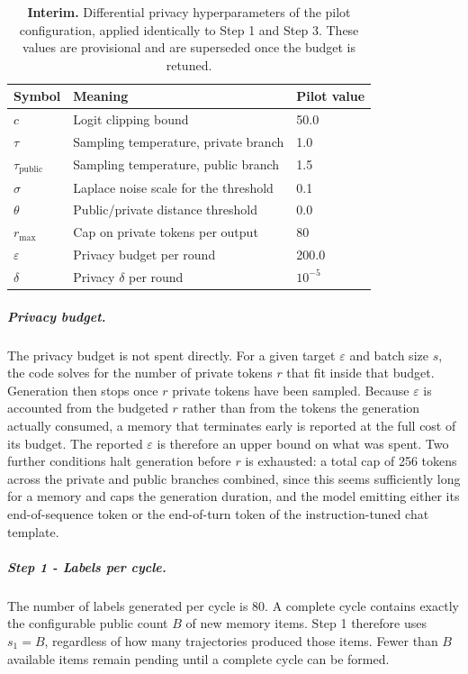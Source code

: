 \begin{table}[t]
\centering
\begin{tabular}{l|l|l}
\hline
\textbf{Symbol} & \textbf{Meaning} & \textbf{Pilot value} \\
\hline
$c$ & Logit clipping bound & 50.0 \\
$\tau$ & Sampling temperature, private branch & 1.0 \\
$\tau_{\text{public}}$ & Sampling temperature, public branch & 1.5 \\
$\sigma$ & Laplace noise scale for the threshold & 0.1 \\
$\theta$ & Public/private distance threshold & 0.0 \\
$r_{\max}$ & Cap on private tokens per output & 80 \\
$\varepsilon$ & Privacy budget per round & 200.0 \\
$\delta$ & Privacy $\delta$ per round & $10^{-5}$ \\
\hline
\end{tabular}
\caption{\textbf{Interim.} Differential privacy hyperparameters of the pilot configuration, applied identically to Step 1 and Step 3. These values are provisional and are superseded once the budget is retuned.}
\label{tab:dp-hyperparameters}
\end{table}

\subparagraph{Privacy budget.} The privacy budget is not spent directly. For a given target $\varepsilon$ and batch size $s$, the code solves for the number of private tokens $r$ that fit inside that budget. Generation then stops once $r$ private tokens have been sampled. Because $\varepsilon$ is accounted from the budgeted $r$ rather than from the tokens the generation actually consumed, a memory that terminates early is reported at the full cost of its budget. The reported $\varepsilon$ is therefore an upper bound on what was spent. Two further conditions halt generation before $r$ is exhausted: a total cap of 256 tokens across the private and public branches combined, since this seems sufficiently long for a memory and caps the generation duration, and the model emitting either its end-of-sequence token or the end-of-turn token of the instruction-tuned chat template.

\subparagraph{Step 1 - Labels per cycle.}
The number of labels generated per cycle is 80. A complete cycle contains exactly the configurable public count $B$ of new memory items. Step 1 therefore uses $s_1=B$, regardless of how many trajectories produced those items. Fewer than $B$ available items remain pending until a complete cycle can be formed.


